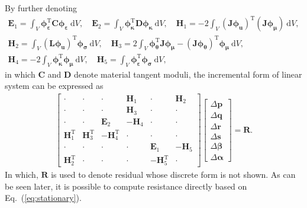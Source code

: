\documentclass[3p,sort&compress,11pt,fleqn]{elsarticle}
\newcommand*{\eqsref}[1]{Eq.~(\ref{#1})}
\newcommand*{\mT}{\mathrm{T}}
\newcommand*{\md}[1]{\mathrm{d}#1}
\begin{document}
By further denoting
\begin{gather*}
\mathbold{E}_1=\int_V\mathbold{\phi}_\mathbold{\varepsilon}^\mT\mathbold{C}\mathbold{\phi}_\mathbold{\varepsilon}~\md{V},\quad
\mathbold{E}_2=\int_V\mathbold{\phi}_\mathbold{\kappa}^\mT\mathbold{D}\mathbold{\phi}_\mathbold{\kappa}~\md{V},\quad
\mathbold{H}_1=-2\int_V\left(\mathbold{J}\mathbold{\phi}_\mathbold{u}\right)^\mT\left(\mathbold{J}\mathbold{\phi}_\mathbold{\mu}\right)~\md{V},\\
\mathbold{H}_2=\int_V\left(\mathbold{L}\mathbold{\phi}_\mathbold{u}\right)^\mT\mathbold{\phi}_\mathbold{\sigma}~\md{V},\quad
\mathbold{H}_3=2\int_V\mathbold{\phi}_\mathbold{\theta}^\mT\mathbold{J}\mathbold{\phi}_\mathbold{\mu}-\left(\mathbold{J}\mathbold{\phi}_\mathbold{\theta}\right)^\mT\mathbold{\phi}_\mathbold{\mu}~\md{V},\\
\mathbold{H}_4=-2\int_V\mathbold{\phi}_\mathbold{\kappa}^\mT\mathbold{\phi}_\mathbold{\mu}~\md{V},\quad
\mathbold{H}_5=\int_V\mathbold{\phi}_\mathbold{\varepsilon}^\mT\mathbold{\phi}_\mathbold{\sigma}~\md{V},\quad
\end{gather*}
in which $\mathbold{C}$ and $\mathbold{D}$ denote material tangent moduli, the incremental form of linear system can be expressed as
\begin{gather}\label{eq:incremental_form}
\begin{bmatrix}
\cdot&\cdot&\cdot&\mathbold{H}_1&\cdot&\mathbold{H}_2\\
\cdot&\cdot&\cdot&\mathbold{H}_3&\cdot&\cdot\\
\cdot&\cdot&\mathbold{E}_2&-\mathbold{H}_4&\cdot&\cdot\\
\mathbold{H}_1^\mT&\mathbold{H}_3^\mT&-\mathbold{H}_4^\mT&\cdot&\cdot&\cdot\\
\cdot&\cdot&\cdot&\cdot&\mathbold{E}_1&-\mathbold{H}_5\\
\mathbold{H}_2^\mT&\cdot&\cdot&\cdot&-\mathbold{H}_5^\mT&\cdot
\end{bmatrix}
\begin{bmatrix}
\Delta\mathbold{p}\\\Delta\mathbold{q}\\\Delta\mathbold{r}\\\Delta\mathbold{s}\\\Delta\mathbold{\beta}\\\Delta\mathbold{\alpha}
\end{bmatrix}=\mathbold{R}.
\end{gather}
In which, $\mathbold{R}$ is used to denote residual whose discrete form is not shown. As can be seen later, it is possible to compute resistance directly based on \eqsref{eq:stationary}.
\end{document}
